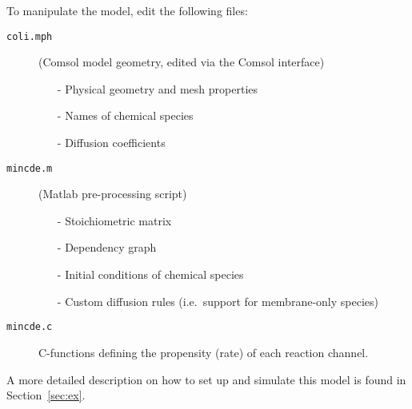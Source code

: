 To manipulate the model, edit the following files:
  \begin{description}
  \item[\texttt{coli.mph}] (Comsol model geometry, edited via the
    Comsol interface)
    \begin{itemize}
    \item[-] Physical geometry and mesh properties
    \item[-] Names of chemical species
    \item[-] Diffusion coefficients
    \end{itemize}
  \item[\texttt{mincde.m}] (Matlab pre-processing script)
    \begin{itemize}
    \item[-] Stoichiometric matrix
    \item[-] Dependency graph
    \item[-] Initial conditions of chemical species
    \item[-] Custom diffusion rules (i.e.~support for membrane-only species)
    \end{itemize}
  \item[\texttt{mincde.c}] C-functions defining the propensity (rate)
    of each reaction channel.
  \end{description}

A more detailed description on how to set up and simulate this model
is found in Section~\ref{sec:ex}.
